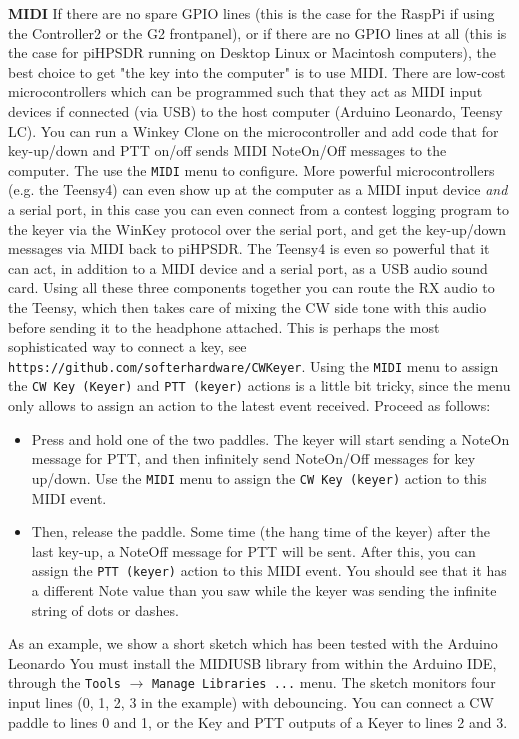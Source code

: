 \documentclass[12pt]{book}
\def\bltt#1{\texttt{\color{blue}#1}}
\begin{document}
\textbf{MIDI}
If there are no spare GPIO lines (this is the case for the RaspPi if using the
Controller2 or the G2 frontpanel), or if there are no GPIO lines at all (this is
the case for piHPSDR running on Desktop Linux or Macintosh computers), the best
choice to get "the key into the computer" is to use MIDI. There are low-cost
microcontrollers which can be programmed such that they act as MIDI input devices
if connected (via USB) to the host computer (Arduino Leonardo, Teensy LC). You can
run a Winkey Clone on the microcontroller and add code that for key-up/down and
PTT on/off sends MIDI NoteOn/Off messages to the computer. The use the
\bltt{MIDI} menu to configure. More powerful microcontrollers (e.g. the Teensy4)
can even show up at the computer as a MIDI input device \textit{and} a serial port,
in this case you can even connect from a contest logging program to  the keyer
via the WinKey protocol over the serial port, and get the key-up/down messages
via MIDI back to piHPSDR. The Teensy4 is even so powerful that it can act, in
addition to a MIDI device and a serial port, as a USB audio sound card.
Using all these three components together you can route the RX audio to the
Teensy, which then takes care of mixing the CW side tone with this audio
before sending it to the headphone attached. This is perhaps the most
sophisticated way to connect a key, see \texttt{https://github.com/softerhardware/CWKeyer}.
Using the \bltt{MIDI} menu to assign the \bltt{CW Key (Keyer)} and \bltt{PTT (keyer)}
actions is a little bit tricky, since the menu only allows to assign an action to
the latest event received. Proceed as follows:

\begin{itemize}
\item{Press and hold one of the two paddles. The keyer will start sending a NoteOn
message for PTT, and then infinitely send NoteOn/Off messages for key up/down.
Use the \bltt{MIDI} menu to assign the \bltt{CW Key (keyer)} action to this MIDI event.}
\item{Then, release the paddle. Some time (the hang time of the keyer) after the last
key-up, a NoteOff message for PTT will be sent. After this, you can assign the
\bltt{PTT (keyer)} action to this MIDI event. You should see that it has a different
Note value than you saw while the keyer was sending the infinite string of dots or
dashes.}
\end{itemize}

As an example, we show a short sketch which has been tested with the Arduino Leonardo
You must install the MIDIUSB library from within the Arduino IDE, through the
\texttt{Tools} $\to$ \texttt{Manage Libraries ...}  menu. The sketch monitors four
input lines (0, 1, 2, 3 in the example) with debouncing. You can connect a CW paddle
to lines 0 and 1, or the Key and PTT outputs of a Keyer to lines 2 and 3.
\end{document}
